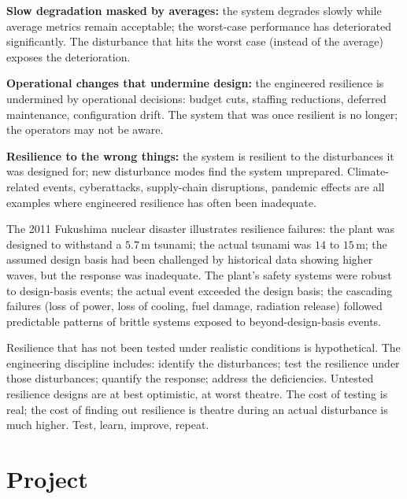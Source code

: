 \textbf{Slow degradation masked by averages:} the system degrades slowly while average metrics remain acceptable; the worst-case performance has deteriorated significantly. The disturbance that hits the worst case (instead of the average) exposes the deterioration.

\textbf{Operational changes that undermine design:} the engineered resilience is undermined by operational decisions: budget cuts, staffing reductions, deferred maintenance, configuration drift. The system that was once resilient is no longer; the operators may not be aware.

\textbf{Resilience to the wrong things:} the system is resilient to the disturbances it was designed for; new disturbance modes find the system unprepared. Climate-related events, cyberattacks, supply-chain disruptions, pandemic effects are all examples where engineered resilience has often been inadequate.

The 2011 Fukushima nuclear disaster illustrates resilience failures: the plant was designed to withstand a $5.7\,\text{m}$ tsunami; the actual tsunami was $14$ to $15\,\text{m}$; the assumed design basis had been challenged by historical data showing higher waves, but the response was inadequate. The plant's safety systems were robust to design-basis events; the actual event exceeded the design basis; the cascading failures (loss of power, loss of cooling, fuel damage, radiation release) followed predictable patterns of brittle systems exposed to beyond-design-basis events.

\begin{principle}
Resilience that has not been tested under realistic conditions is hypothetical. The engineering discipline includes: identify the disturbances; test the resilience under those disturbances; quantify the response; address the deficiencies. Untested resilience designs are at best optimistic, at worst theatre. The cost of testing is real; the cost of finding out resilience is theatre during an actual disturbance is much higher. Test, learn, improve, repeat.
\end{principle}

\section{Project}

